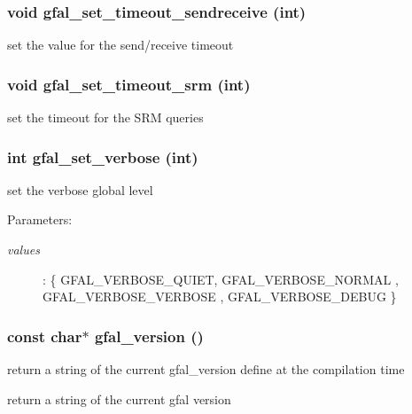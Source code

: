 \subsubsection{\setlength{\rightskip}{0pt plus 5cm}void gfal\_\-set\_\-timeout\_\-sendreceive (int)}\label{group__common__group_gedd91bb343f17bc2c0ba9db1203f1819}


set the value for the send/receive timeout 
\subsubsection{\setlength{\rightskip}{0pt plus 5cm}void gfal\_\-set\_\-timeout\_\-srm (int)}\label{group__common__group_gc0dac1437f150d4b5b8779f456050bec}


set the timeout for the SRM queries 
\subsubsection{\setlength{\rightskip}{0pt plus 5cm}int gfal\_\-set\_\-verbose (int)}\label{group__common__group_g331e181c2fadd801321ad43033835052}


set the verbose global level 

\begin{Desc}
\item[Parameters:]
\begin{description}
\item[{\em values}]: \{ GFAL\_\-VERBOSE\_\-QUIET, GFAL\_\-VERBOSE\_\-NORMAL , GFAL\_\-VERBOSE\_\-VERBOSE , GFAL\_\-VERBOSE\_\-DEBUG \} \end{description}
\end{Desc}
\subsubsection{\setlength{\rightskip}{0pt plus 5cm}const char$\ast$ gfal\_\-version ()}\label{group__common__group_ga5a8df616e6a5e6fc1d94e2374c7ccf2}


return a string of the current gfal\_\-version define at the compilation time 

return a string of the current gfal version 